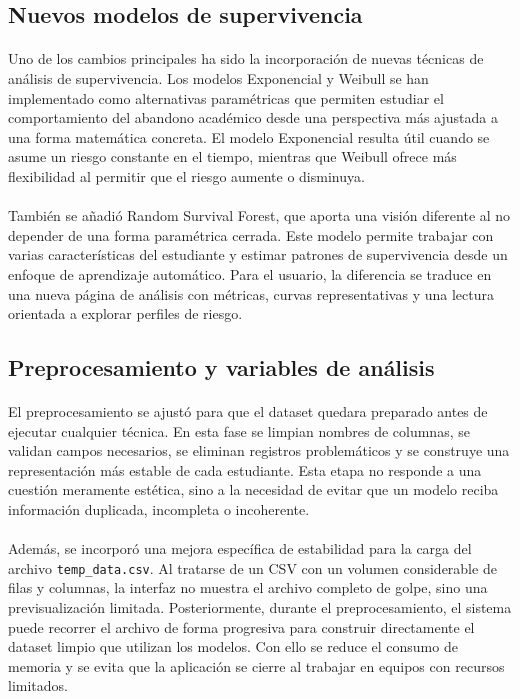 \subsection{Nuevos modelos de supervivencia}

\paragraph*{}
Uno de los cambios principales ha sido la incorporación de nuevas técnicas de análisis de supervivencia. Los modelos Exponencial y Weibull se han implementado como alternativas paramétricas que permiten estudiar el comportamiento del abandono académico desde una perspectiva más ajustada a una forma matemática concreta. El modelo Exponencial resulta útil cuando se asume un riesgo constante en el tiempo, mientras que Weibull ofrece más flexibilidad al permitir que el riesgo aumente o disminuya.

\paragraph*{}
También se añadió Random Survival Forest, que aporta una visión diferente al no depender de una forma paramétrica cerrada. Este modelo permite trabajar con varias características del estudiante y estimar patrones de supervivencia desde un enfoque de aprendizaje automático. Para el usuario, la diferencia se traduce en una nueva página de análisis con métricas, curvas representativas y una lectura orientada a explorar perfiles de riesgo.

\subsection{Preprocesamiento y variables de análisis}

\paragraph*{}
El preprocesamiento se ajustó para que el dataset quedara preparado antes de ejecutar cualquier técnica. En esta fase se limpian nombres de columnas, se validan campos necesarios, se eliminan registros problemáticos y se construye una representación más estable de cada estudiante. Esta etapa no responde a una cuestión meramente estética, sino a la necesidad de evitar que un modelo reciba información duplicada, incompleta o incoherente.

\paragraph*{}
Además, se incorporó una mejora específica de estabilidad para la carga del archivo \texttt{temp\_data.csv}. Al tratarse de un CSV con un volumen considerable de filas y columnas, la interfaz no muestra el archivo completo de golpe, sino una previsualización limitada. Posteriormente, durante el preprocesamiento, el sistema puede recorrer el archivo de forma progresiva para construir directamente el dataset limpio que utilizan los modelos. Con ello se reduce el consumo de memoria y se evita que la aplicación se cierre al trabajar en equipos con recursos limitados.

